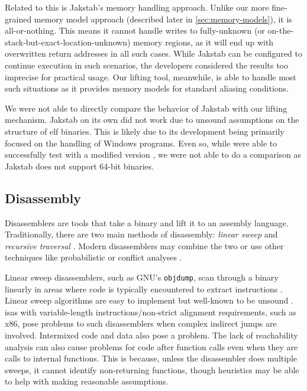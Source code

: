 Related to this is Jakstab's memory handling approach.
Unlike our more fine-grained memory model approach (described later in \cref{sec:memory-models}), it is all-or-nothing.
This means it cannot handle writes to fully-unknown
(or on-the-stack-but-exact-location-unknown) memory regions,
as it will end up with overwritten return addresses in all such cases.
While Jakstab can be configured to continue execution in such scenarios,
the developers considered the results too imprecise for practical usage.
Our lifting tool, meanwhile, is able to handle most such situations
as it provides memory models for standard aliasing conditions.

\begin{remark}
  We were not able to directly compare the behavior of Jakstab with our lifting mechanism.
  Jakstab on its own did not work due to unsound assumptions on the structure of \ac{elf} binaries.
  This is likely due to its development being primarily focused on the handling of Windows programs.
  Even so, while were able to successfully test with a modified version \autocite{peterson2019},%
  we were not able to do a comparison as Jakstab does not support 64-bit binaries.
\end{remark}

\subsection{Disassembly}\label{related-disassembly}
Disassemblers are tools that take a binary and lift it to an assembly language.
Traditionally, there are two main methods of disassembly: \emph{linear sweep}
and \emph{recursive traversal} \autocite{schwartz2002disassembly}.
Modern disassemblers may combine the two or use other techniques like probabilistic \autocite{wartell2011differentiating,wartell2014shingled,miller2019probabilistic} or conflict analyses \autocite{khadra2016speculative}.

Linear sweep disassemblers, such as GNU's
\lstinline|objdump|, scan through a binary linearly
in areas where code is typically encountered
to extract instructions \autocite{schwartz2002disassembly}.
Linear sweep algorithms are easy to implement but well-known to be unsound \autocite{schwartz2002disassembly}.
\Acp{isa} with variable-length instructions/non-strict alignment requirements, such as \gls{x86}, pose problems to such disassemblers when complex indirect jumps are involved.
Intermixed code and data also pose a problem.
The lack of reachability analysis can also cause problems for code after function calls even when they are calls to internal functions.
This is because, unless the disassembler does multiple sweeps, it cannot identify non-returning functions, though heuristics may be able to help with making reasonable assumptions.

